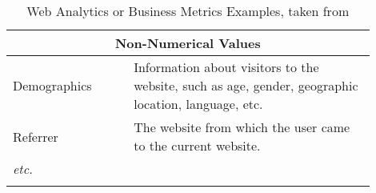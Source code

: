 \begin{center}
\begin{longtable}{ | p{0.3\linewidth} | p{0.6\linewidth} | }
	\hline
	\multicolumn{2}{|c|}{ \cellcolor{lightgrey} Non-Numerical Values} \\
	\hline
	Demographics & Information about visitors to the website, such as age, gender, geographic location, language, etc. \\	
	\hline
	Referrer & The website from which the user came to the current website. \\	
	\hline
	\textit{etc.} &  \\
	\hline
	
	\caption{Web Analytics or Business Metrics Examples, taken from } %
	\label{table:businessmetrics}
	\end{longtable}
\end{center}












